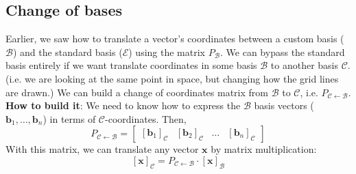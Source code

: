 \documentclass[../linear-algebra.tex]{subfiles}
\begin{document}
\subsection{Change of bases}
Earlier, we saw how to translate a vector's coordinates between a custom basis ($\mathcal{B}$) and the standard basis ($\mathcal{E}$) using the matrix $P_{\mathcal{B}}$.\newline
We can bypass the standard basis entirely if we want translate coordinates in some basis $\mathcal{B}$ to another basis $\mathcal{C}$. (i.e. we are looking at the same point in space, but changing how the grid lines are drawn.)\newline
We can build a change of coordinates matrix from $\mathcal{B}$ to $\mathcal{C}$, i.e. $P_{\mathcal{C}\leftarrow\mathcal{B}}$.\newline
\textbf{How to build it}: We need to know how to express the $\mathcal{B}$ basis vectors ($\mathbf{b}_1, \dots, \mathbf{b}_n$) in terms of $\mathcal{C}$-coordinates. Then,\newline
$$P_{\mathcal{C}\leftarrow\mathcal{B}} = \begin{bmatrix} [\mathbf{b}_1]_{\mathcal{C}} & [\mathbf{b}_2]_{\mathcal{C}} & \dots & [\mathbf{b}_n]_{\mathcal{C}} \end{bmatrix}$$
With this matrix, we can translate any vector $\mathbf{x}$ by matrix multiplication:
$$[\mathbf{x}]_{\mathcal{C}} = P_{\mathcal{C}\leftarrow\mathcal{B}} \cdot [\mathbf{x}]_{\mathcal{B}}$$
\end{document}
